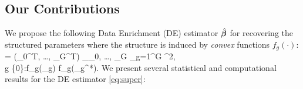 \subsection{Our Contributions}
We propose the following Data Enrichment (DE) estimator $\hat{\boldsymbol{\beta}}$ for recovering the structured parameters where the structure is induced by \emph{convex} functions $f_g(\cdot)$:
{\small\be
	\label{eq:super}
	\hbbe = (\hbbe_0^T, \dots, \hbbe_G^T) \in \argmin_{\bbeta _0, \dots, \bbeta _G}  \sum_{g=1}^{G} ^2,
	\\ \nr
	 \quad \forall g \in [G] \cup \{0\}:f_g(\bbeta _g) \leq f_g(\bbeta _g^*).
\ee}
We present several statistical and computational results for the DE estimator \eqref{eq:super}:%
